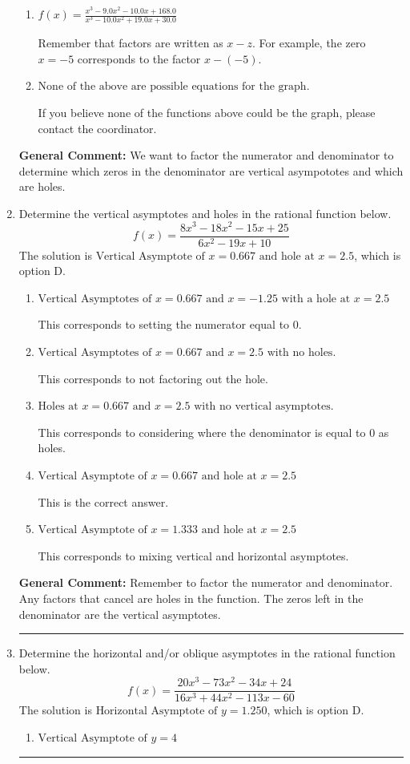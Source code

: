 \documentclass{extbook}[14pt]
\newcommand{\litem}[1]{\item #1

\rule{\textwidth}{0.4pt}}
\begin{document}
\begin{enumerate}
{\begin{enumerate}[label=\Alph*.]
This is the correct answer!
\item \( f(x)=\frac{x^{3} -9.0 x^{2} -10.0 x + 168.0}{x^{3} -10.0 x^{2} +19.0 x + 30.0} \)

Remember that factors are written as $x-z$. For example, the zero $x=-5$ corresponds to the factor $x-(-5)$.
\item \( \text{None of the above are possible equations for the graph.} \)

If you believe none of the functions above could be the graph, please contact the coordinator.
\end{enumerate}

\textbf{General Comment:} We want to factor the numerator and denominator to determine which zeros in the denominator are vertical asympototes and which are holes.
}
\litem{
Determine the vertical asymptotes and holes in the rational function below.
\[ f(x) = \frac{8x^{3} -18 x^{2} -15 x + 25}{6x^{2} -19 x + 10} \]The solution is \( \text{Vertical Asymptote of } x = 0.667 \text{ and hole at } x = 2.5 \), which is option D.\begin{enumerate}[label=\Alph*.]
\item \( \text{Vertical Asymptotes of } x = 0.667 \text{ and } x = -1.25 \text{ with a hole at } x = 2.5 \)

This corresponds to setting the numerator equal to 0.
\item \( \text{Vertical Asymptotes of } x = 0.667 \text{ and } x = 2.5 \text{ with no holes.} \)

This corresponds to not factoring out the hole.
\item \( \text{Holes at } x = 0.667 \text{ and } x = 2.5 \text{ with no vertical asymptotes.} \)

This corresponds to considering where the denominator is equal to 0 as holes.
\item \( \text{Vertical Asymptote of } x = 0.667 \text{ and hole at } x = 2.5 \)

This is the correct answer.
\item \( \text{Vertical Asymptote of } x = 1.333 \text{ and hole at } x = 2.5 \)

This corresponds to mixing vertical and horizontal asymptotes.
\end{enumerate}

\textbf{General Comment:} Remember to factor the numerator and denominator. Any factors that cancel are holes in the function. The zeros left in the denominator are the vertical asymptotes.
}
\litem{
Determine the horizontal and/or oblique asymptotes in the rational function below.
\[ f(x) = \frac{20x^{3} -73 x^{2} -34 x + 24}{16x^{3} +44 x^{2} -113 x -60} \]The solution is \( \text{Horizontal Asymptote of } y = 1.250  \), which is option D.\begin{enumerate}[label=\Alph*.]
\item \( \text{Vertical Asymptote of } y = 4  \)


\end{enumerate}}
\end{enumerate}
\end{document}
